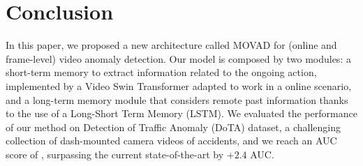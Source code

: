 \section{Conclusion}
\label{sec:conclusions}

In this paper, we proposed a new architecture called MOVAD for (online and frame-level) video anomaly detection.
Our model is composed by two modules: a short-term memory to extract information related to the ongoing action, implemented by a Video Swin Transformer adapted to work in a online scenario, and a long-term memory module that considers remote past information thanks to the use of a Long-Short Term Memory (LSTM).
We evaluated the performance of our method on Detection of Traffic Anomaly (DoTA) dataset, a challenging collection of dash-mounted camera videos of accidents, and we reach an AUC score of , surpassing the current state-of-the-art by $+2.4$ AUC.